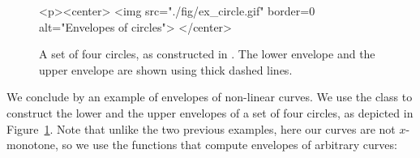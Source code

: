 
\begin{figure}[t]
\begin{ccTexOnly}
  \begin{center}
  \end{center}
\end{ccTexOnly}
\begin{ccHtmlOnly}
  <p><center>
  <img src="./fig/ex_circle.gif" border=0 alt="Envelopes of circles">
  </center>
\end{ccHtmlOnly}
\caption{A set of four circles, as constructed in
. The lower envelope and the upper
envelope are shown using thick dashed lines.\label{env2_fig:ex_circ}}
\end{figure}

We conclude by an example of envelopes of non-linear curves. 
We use the  class to construct the
lower and the upper envelopes of a set of four circles, as depicted
in Figure~\ref{env2_fig:ex_circ}. Note that unlike the two previous
examples, here our curves are not $x$-monotone, so we use the functions
that compute envelopes of arbitrary curves:

